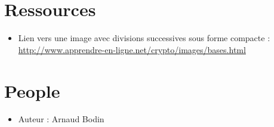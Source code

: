\documentclass[class=report,crop=false, 12pt]{standalone}
\begin{document}
\section*{Ressources}

\begin{itemize}
  \item Lien vers une image avec divisions successives sous forme compacte : \href{http://www.apprendre-en-ligne.net/crypto/images/bases.html}{http://www.apprendre-en-ligne.net/crypto/images/bases.html}
\end{itemize}



\section*{People}

\begin{itemize}
  \item Auteur : Arnaud Bodin
\end{itemize}
\end{document}
